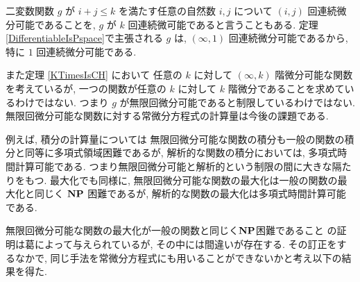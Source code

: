 二変数関数 $g$ が
$i+j \le k$ を満たす任意の自然数 $i,j$ について
$(i,j)$ 回連続微分可能であることを, 
$g$ が $k$ 回連続微可能であると言うこともある.
定理\ref{DifferentiableIsPspace}で主張される $g$ は, 
$(\infty, 1)$ 回連続微分可能であるから, 
特に $1$ 回連続微分可能である. 

 また定理 \ref{KTimesIsCH} において
 任意の $k$ に対して $(\infty, k)$ 階微分可能な関数を考えているが,
 一つの関数が任意の $k$ に対して $k$ 階微分であることを求めているわけではない.
 つまり $g$ が無限回微分可能であると制限しているわけではない. 
 無限回微分可能な関数に対する常微分方程式の計算量は今後の課題である.

例えば, 積分の計算量については
無限回微分可能な関数の積分も一般の関数の積分と同等に多項式領域困難であるが,
解析的な関数の積分においては, 多項式時間計算可能である.
つまり無限回微分可能と解析的という制限の間に大きな隔たりをもつ.
最大化でも同様に, 無限回微分可能な関数の最大化は一般の関数の最大化と同じく
$\mathbf{NP}$ 困難であるが,
解析的な関数の最大化は多項式時間計算可能である.


無限回微分可能な関数の最大化が一般の関数と同じく$\mathbf{NP}$困難であること
の証明は葛によって与えられているが, その中には間違いが存在する.
その訂正をするなかで, 同じ手法を常微分方程式にも用いることができないかと考え以下の結果を得た.
